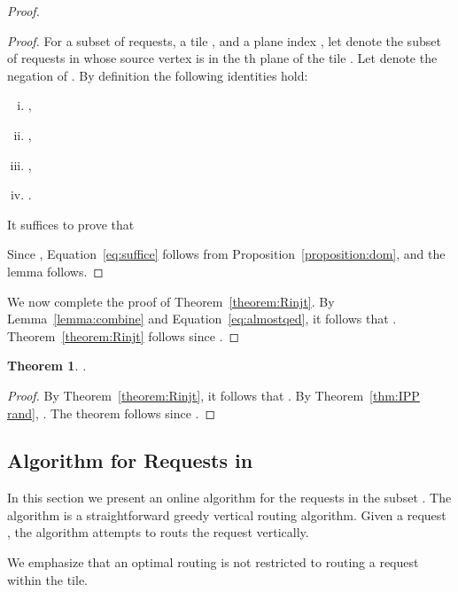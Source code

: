 \documentclass[11pt]{article}
\newtheorem{theorem}{Theorem}
\newenvironment{proof sketch}[1]{\noindent {\emph{Proof sketch of #1:}}}{\hfill \qed}
\newcommand{\near}{\text{\emph{Near}}}
\begin{document}
\begin{proof}
\begin{proof}
  For a subset  of requests, a tile , and a plane index , let
   denote the subset of requests in  whose source vertex is in
  the th plane of the tile .  Let  denote the negation of .  By
  definition the following identities hold:
  \begin{enumerate}[(i)]
    \item ,
    \item ,
    \item ,
    \item .
  \end{enumerate}

It suffices to prove that

Since , Equation~\eqref{eq:suffice} follows from Proposition~\ref{proposition:dom}, and the
lemma follows.
\end{proof}

We now complete the proof of Theorem~\ref{theorem:Rinjt}. By
Lemma~\ref{lemma:combine} and Equation~\eqref{eq:almostqed}, it follows that
. Theorem~\ref{theorem:Rinjt}
follows since .
\end{proof}


\begin{theorem}\label{thm:far}
  .
  \end{theorem}
  \begin{proof}
 By Theorem~\ref{theorem:Rinjt}, it follows that
    . By
    Theorem~\ref{thm:IPP rand}, . The theorem follows since .
  \end{proof}
\subsection{Algorithm for Requests in \near}\label{sec:near}
In this section we present an online algorithm for the requests in the
subset .  The algorithm is a straightforward greedy vertical
routing algorithm.
Given a request , the algorithm
attempts to routs the request vertically.

\begin{comment}
Upon arrival of a request , the computation of the path
for  proceeds as follows:
\begin{enumerate}
    \item Let .
    \item While the vertical path from  to  is saturated:
    \begin{enumerate}
        \item If the horizontal edge is not saturated move to the right (i.e, ).
        \item Else, if the horizontal edge saturated then \textbf{reject}.
        \item If  is outside the tile, then \textbf{reject} .
    \end{enumerate}
    \item If a nonsaturated vertical path is found, then the path consists of the
        concatenation of the horizontal path from  to  and
        the vertical path from  to .
\end{enumerate}
\end{comment}
We emphasize that an optimal routing is not restricted to routing a
request  within the tile.
\end{document}
